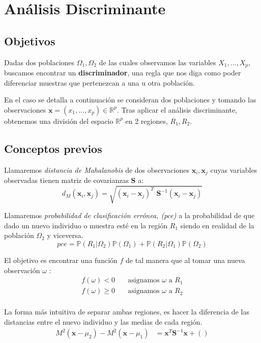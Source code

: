 \section{Análisis Discriminante}
\subsection{Objetivos}

\noindent Dadas dos poblaciones $\Omega_1,\Omega_2$ de las cuales observamos las variables $X_1, \ldots, X_p$, buscamos encontrar un \textbf{discriminador}, una regla que nos diga como poder diferenciar muestras que pertenezcan a una u otra población. 

\noindent En el caso se detalla a continuación se consideran dos poblaciones y tomando las observaciones $\textbf{x}=(x_1,\ldots,x_p)\in \mathbb{R}^p $. Tras aplicar el análisis discriminante, obtenemos una división del espacio $\mathbb{R}^p$ en 2 regiones, $R_1, R_2$. 

\subsection{Conceptos previos}
\begin{defi}
Llamaremos \textit{distancia de Mahalanobis} de dos observaciones $\textbf{x}_i,\textbf{x}_j$ cuyas variables observadas tienen matriz de covarianzas \textbf{S} a:
\begin{equation}
d_M(\textbf{x}_i,\textbf{x}_j)=\sqrt{(\textbf{x}_i-\textbf{x}_j)^T\textbf{ S}^{-1}(\textbf{x}_i-\textbf{x}_j) }
\end{equation}
\end{defi}

\begin{defi}
Llamaremos \textit{probabilidad de clasificación errónea, (pce)} a la probabilidad de que dado un nuevo individuo o muestra esté en la región $R_1$ siendo en realidad de la población $\Omega_2$ y viceversa. 
\begin{equation}
pce=\mathbb{P}(R_1|\Omega_2) \mathbb{P}(\Omega_1)+\mathbb{P}(R_2|\Omega_1) \mathbb{P}(\Omega_2)
\end{equation}
\end{defi}

\noindent El objetivo es encontrar una función $f$ de tal manera que al tomar una nueva observación $\omega$ :
\begin{align*}
f(\omega)<0 \quad &\text{asignamos } \omega \text{ a } R_1\\
f(\omega)\geq 0 \quad &\text{asignamos } \omega \text{ a } R_2\\
\end{align*}

\noindent La forma más intuitiva de separar ambas regiones, es hacer la diferencia de las distancias entre el nuevo individuo y las medias de cada región. 
\begin{align*}
M^2(\textbf{x}-\mu_2)-M^2(\textbf{x}-\mu_1)  &= \textbf{x}^T\textbf{S}^{-1} \textbf{x}+()
\end{align*}


\noindent